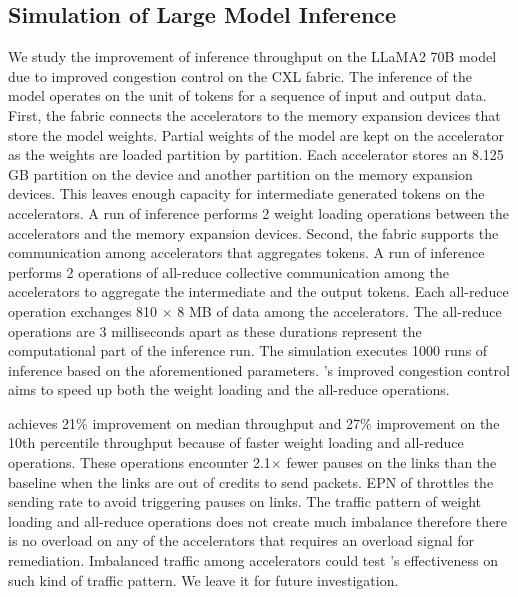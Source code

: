 \subsection{Simulation of Large Model Inference}
\label{aurelia:sec:eval:inf}
%
We study the improvement of inference throughput on the LLaMA2 70B model~\cite{llama:arxiv:2023} due to improved congestion control on the CXL fabric.
%
The inference of the model operates on the unit of tokens for a sequence of input and output data.
%
First, the fabric connects the accelerators to the memory expansion devices that store the model weights.
%
Partial weights of the model are kept on the accelerator as the weights are loaded partition by partition.  
%
Each accelerator stores an 8.125 GB partition on the device and another partition on the memory expansion devices.
%
This leaves enough capacity for intermediate generated tokens on the accelerators.
%
A run of inference performs 2 weight loading operations between the accelerators and the memory expansion devices.
%
Second, the fabric supports the communication among accelerators that aggregates tokens.
%
A run of inference performs 2 operations of all-reduce collective communication among the accelerators to aggregate the intermediate and the output tokens.
%
Each all-reduce operation exchanges 810 $\times$ 8 MB of data among the accelerators.
%
The all-reduce operations are 3 milliseconds apart as these durations represent the computational part of the inference run.
%
The simulation executes 1000 runs of inference based on the aforementioned parameters.  
%
\aurelia's improved congestion control aims to speed up both the weight loading and the all-reduce operations.
%

\aurelia achieves 21\% improvement on median throughput and 27\% improvement on the 10th percentile throughput because of faster weight loading and all-reduce operations.
%
These operations encounter 2.1$\times$ fewer pauses on the links than the baseline when the links are out of credits to send packets.
%
EPN of \aurelia throttles the sending rate to avoid triggering pauses on links. 
%
The traffic pattern of weight loading and all-reduce operations does not create much imbalance therefore there is no overload on any of the accelerators that requires an overload signal for remediation.
%
Imbalanced traffic among accelerators could test \aurelia's effectiveness on such kind of traffic pattern. 
%
We leave it for future investigation.

